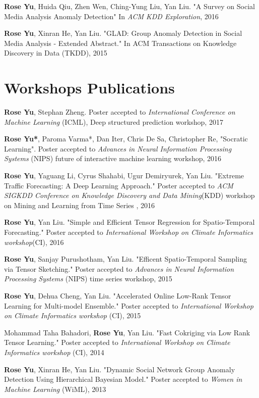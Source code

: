 \documentclass[margin,line]{res}
\begin{document}
\begin{resume}
{\bf Rose Yu}, Huida Qiu, Zhen Wen, Ching-Yung Liu,  Yan Liu. "A Survey on Social Media Analysis  Anomaly Detection" In \textit{ACM KDD Exploration},  2016

{\bf Rose Yu}, Xinran He, Yan Liu. "GLAD: Group Anomaly Detection in Social Media Analysis - Extended Abstract." In \textit{}ACM Transactions on Knowledge Discovery in Data  (TKDD), 2015


\section{\sc Workshops Publications}
{\bf Rose Yu}, Stephan Zheng. Poster accepted to \textit{International Conference on Machine Learning} (ICML), Deep structured prediction workshop, 2017

{\bf Rose Yu*},  Paroma Varma*, Dan Iter, Chris De Sa, Christopher Re,  "Socratic Learning".  Poster accepted to \textit{Advances in Neural Information Processing Systems}  (NIPS) future of interactive machine learning workshop, 2016


{\bf Rose Yu}, Yaguang Li, Cyrus Shahabi, Ugur Demiryurek, Yan Liu. "Extreme Traffic Forecasting: A Deep Learning Approach." Poster accepted to \textit{ACM SIGKDD Conference on Knowledge Discovery and Data Mining}(KDD)  workshop on Mining and Learning from Time Series , 2016


{\bf Rose Yu}, Yan Liu. "Simple and Efficient Tensor Regression for Spatio-Temporal Forecasting." Poster accepted to \textit{International Workshop on Climate Informatics workshop}(CI), 2016

{\bf Rose Yu}, Sanjay Purushotham, Yan Liu. "Efficent Spatio-Temporal Sampling via Tensor Sketching." Poster accepted to \textit{Advances in Neural Information Processing Systems}  (NIPS) time series workshop, 2015   


{\bf Rose Yu}, Dehua Cheng, Yan Liu. "Accelerated Online Low-Rank Tensor Learning for Multi-model Ensemble." Poster accepted to \textit{International Workshop on Climate Informatics workshop} (CI), 2015

Mohammad Taha Bahadori, {\bf Rose Yu}, Yan Liu. "Fast Cokriging via Low Rank Tensor Learning." Poster accepted to \textit{International Workshop on Climate Informatics workshop} (CI), 2014

{\bf Rose Yu}, Xinran He, Yan Liu. "Dynamic Social Network Group Anomaly Detection Using Hierarchical Bayesian Model." Poster accepted to \textit{Women in Machine Learning } (WiML), 2013



\end{resume}
\end{document}
